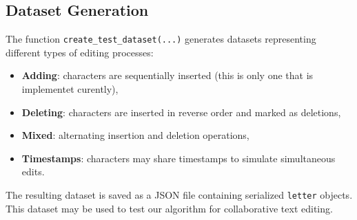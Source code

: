 \subsection{Dataset Generation}

The function \texttt{create\_test\_dataset(...)} generates datasets representing different types of editing processes:
\begin{itemize}
    \item \textbf{Adding}: characters are sequentially inserted (this is only one that is implementet curently),
    \item \textbf{Deleting}: characters are inserted in reverse order and marked as deletions,
    \item \textbf{Mixed}: alternating insertion and deletion operations,
    \item \textbf{Timestamps}: characters may share timestamps to simulate simultaneous edits.
\end{itemize}

The resulting dataset is saved as a JSON file containing serialized \texttt{letter} objects. This dataset may be used to test our algorithm for collaborative text editing.
